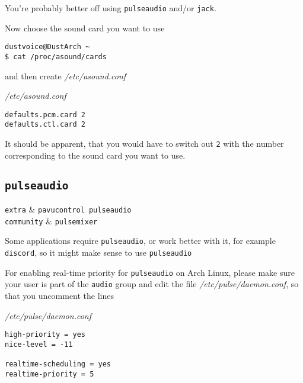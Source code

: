 \documentclass[10pt]{dustdoc}
\begin{document}
\begin{NOTE}
    You’re probably better off using \texttt{pulseaudio} and/or \texttt{jack}.
\end{NOTE}

Now choose the sound card you want to use

\begin{verbatim}
dustvoice@DustArch ~
$ cat /proc/asound/cards
\end{verbatim}

\noindent
and then create \textit{/etc/asound.conf}

\begin{mintedlisting}
    \caption*{\textit{/etc/asound.conf}}
    \begin{verbatim}
defaults.pcm.card 2
defaults.ctl.card 2
    \end{verbatim}
\end{mintedlisting}

\begin{NOTE}
    It should be apparent, that you would have to switch out \texttt{2} with the number corresponding to the sound card you want to use.
\end{NOTE}

\subsection{\texttt{pulseaudio}}
\label{sec:pulseaudio}

\begin{packagetable}
    \texttt{extra} & \texttt{pavucontrol pulseaudio} \\
    \texttt{community} & \texttt{pulsemixer} \\
\end{packagetable}

Some applications require \texttt{pulseaudio}, or work better with it, for example \texttt{discord}, so it might make sense to use \texttt{pulseaudio}

For enabling real-time priority for \texttt{pulseaudio} on Arch Linux, please make sure your user is part of the \texttt{audio} group and edit the file \textit{/etc/pulse/daemon.conf}, so that you uncomment the lines

\begin{mintedlisting}
    \caption*{\textit{/etc/pulse/daemon.conf}}
    \begin{verbatim}
high-priority = yes
nice-level = -11

realtime-scheduling = yes
realtime-priority = 5
    \end{verbatim}
\end{mintedlisting}
\end{document}
